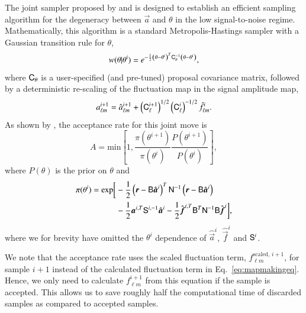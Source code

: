 \documentclass[twocolumn]{../common/aa}
\newcommand{\B}[0]{\tens{B}}
\renewcommand{\C}[0]{\tens{C}}
\renewcommand{\a}[0]{\vec{a}}
\newcommand{\f}[0]{\vec{f}}
\newcommand{\N}[0]{\tens{N}}
\renewcommand{\S}[0]{\tens{S}}
\renewcommand{\r}[0]{\vec{r}}
\begin{document}
The joint sampler proposed by \citet{jewell:2009} and \citet{racine:2016} is designed to establish an efficient sampling algorithm for the degeneracy between $\a$ and $\theta$ in the low signal-to-noise regime. Mathematically, this algorithm is a standard Metropolis-Hastings sampler with a Gaussian transition rule for $\theta$,
\begin{equation}
w(\theta |\theta^i) = e^{-\frac12 \left(\theta - \theta^i \right)^T \C_{\theta}^{-1}\left(\theta - \theta^i \right)},
\end{equation}
where $\C_{\theta}$ is a user-specified (and pre-tuned) proposal covariance matrix, followed by a deterministic re-scaling of the fluctuation map in the signal amplitude map,
\begin{equation}
    a_{\ell m}^{i+1} = \hat{a}_{\ell m}^{i+1} + \left(\C^{i+1}_{\ell}\right)^{1/2}\left(\C^{i}_{\ell}\right)^{-1/2} \hat{f}_{\ell m}^{i}.
\end{equation}
As shown by \citet{racine:2016}, the acceptance rate for this joint move is
\begin{equation}
    \label{eq:acceptance-rate}
    A = \mathrm{min}\left[1, \frac{\pi(\theta^{i+1})}{\pi(\theta^i)} \frac{P(\theta^{i+1})}{P(\theta^i)} \right],
\end{equation}
where $P(\theta)$ is the prior on $\theta$ and
\begin{align}
    \nonumber
    \pi(\theta^{i}) = \mathrm{exp}\bigg[&-\frac12 \left(\r-\B\hat{\a}^i\right)^T \N^{-1}\left(\r-\B\hat{\a}^i\right)\\
    &-\frac12\a^{i,T} \S^{i, -1}\hat{\a}^i -\frac12 \hat{\f}^{i, T}\B^T\N^{-1} \B\hat{\f}^i\bigg],
\end{align}
where we for brevity have omitted the $\theta^i$ dependence of $\hat{\a}^i$, $\hat{\f}^i$ and $\S^i$. 

We note that the acceptance rate uses the scaled fluctuation term, $f_{\ell m}^{\textrm{scaled},\, i+1}$, for sample $i+1$ instead of the calculated fluctuation term in Eq.~\eqref{eq:mapmakingeq}. Hence, we only need to calculate $f_{\ell m}^{i+1}$ from this equation if the sample is accepted. This allows us to save roughly half the computational time of discarded samples as compared to accepted samples.
\end{document}
